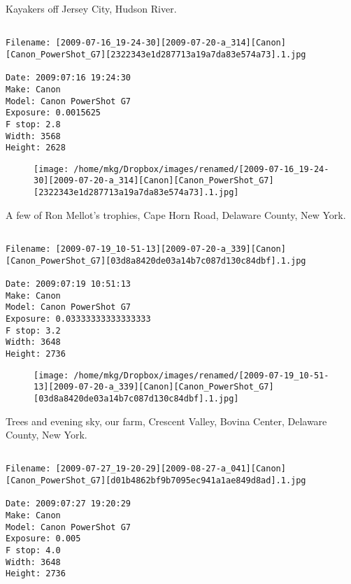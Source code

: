 \clearpage
\onecolumn
\noindent Kayakers off Jersey City, Hudson River.
\noindent
\begin{lstlisting}

Filename: [2009-07-16_19-24-30][2009-07-20-a_314][Canon][Canon_PowerShot_G7][2322343e1d287713a19a7da83e574a73].1.jpg

Date: 2009:07:16 19:24:30
Make: Canon
Model: Canon PowerShot G7
Exposure: 0.0015625
F stop: 2.8
Width: 3568
Height: 2628
\end{lstlisting}
\clearpage

\begin{figure}
\texttt{[image: /home/mkg/Dropbox/images/renamed/[2009-07-16\_19-24-30][2009-07-20-a\_314][Canon][Canon\_PowerShot\_G7][2322343e1d287713a19a7da83e574a73].1.jpg]}
\end{figure}
    
\clearpage
\onecolumn
\noindent A few of Ron Mellot's trophies, Cape Horn Road, Delaware County, New York.
\noindent
\begin{lstlisting}

Filename: [2009-07-19_10-51-13][2009-07-20-a_339][Canon][Canon_PowerShot_G7][03d8a8420de03a14b7c087d130c84dbf].1.jpg

Date: 2009:07:19 10:51:13
Make: Canon
Model: Canon PowerShot G7
Exposure: 0.03333333333333333
F stop: 3.2
Width: 3648
Height: 2736
\end{lstlisting}
\clearpage

\begin{figure}
\texttt{[image: /home/mkg/Dropbox/images/renamed/[2009-07-19\_10-51-13][2009-07-20-a\_339][Canon][Canon\_PowerShot\_G7][03d8a8420de03a14b7c087d130c84dbf].1.jpg]}
\end{figure}
    
\clearpage
\onecolumn
\noindent Trees and evening sky, our farm, Crescent Valley, Bovina Center, Delaware County, New York.
\noindent
\begin{lstlisting}

Filename: [2009-07-27_19-20-29][2009-08-27-a_041][Canon][Canon_PowerShot_G7][d01b4862bf9b7095ec941a1ae849d8ad].1.jpg

Date: 2009:07:27 19:20:29
Make: Canon
Model: Canon PowerShot G7
Exposure: 0.005
F stop: 4.0
Width: 3648
Height: 2736
\end{lstlisting}
\clearpage

